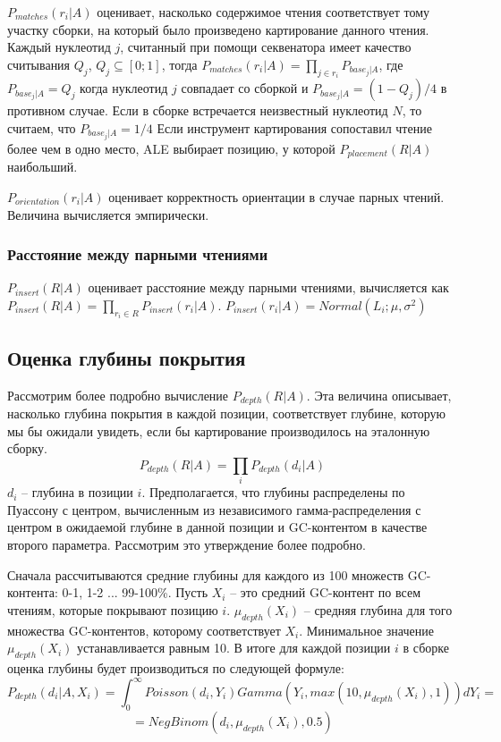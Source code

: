 $P_{matches}(r_i|A)$ оценивает, насколько содержимое чтения соответствует тому участку сборки, на который было произведено картирование данного чтения. Каждый нуклеотид $j$, считанный при помощи секвенатора имеет качество считывания $Q_j$, $Q_j\subseteq[0;1]$, тогда $P_{matches}(r_i|A) = \prod_{j \in r_i}P_{base_j|A}$, где $P_{base_j|A} = Q_j$ когда нуклеотид $j$ совпадает  со сборкой и $P_{base_j|A} = (1 - Q_j)/4$ в противном случае. Если в сборке встречается неизвестный нуклеотид $N$, то считаем, что $P_{base_j|A} = 1/4$
Если инструмент картирования сопоставил чтение более чем в одно место, ALE выбирает позицию, у которой $P_{placement}(R|A)$ наибольший.

$P_{orientation}(r_i|A)$ оценивает корректность ориентации в случае парных чтений. Величина вычисляется эмпирически.

\subsubsection{Расстояние между парными чтениями}
$P_{insert}(R|A)$ оценивает расстояние между парными чтениями, вычисляется как $P_{insert}(R|A)=\prod_{r_i \in R}P_{insert}(r_i|A)$. $P_{insert}(r_i|A) = Normal(L_i; \mu, \sigma^2)$ 

\subsection{Оценка глубины покрытия}

Рассмотрим более подробно вычисление $P_{depth}(R|A)$. Эта величина описывает, насколько глубина покрытия в каждой позиции, соответствует глубине, которую мы бы ожидали увидеть, если бы картирование производилось на эталонную сборку.
$$P_{depth}(R|A) = \prod_{i}P_{depth}(d_i|A)$$ $d_i$ – глубина в позиции $i$. Предполагается, что глубины распределены по Пуассону с центром, вычисленным из независимого гамма-распределения с центром в ожидаемой глубине в данной позиции и GC-контентом в качестве второго параметра. Рассмотрим это утверждение более подробно.

Сначала рассчитываются средние глубины для каждого из 100 множеств GC-контента: 0-1, 1-2 ... 99-100\%. Пусть $X_i$ – это средний GC-контент по всем чтениям, которые покрывают позицию $i$. $\mu_{depth}(X_i)$ – средняя глубина для того множества GC-контентов, которому соответствует $X_i$. Минимальное значение $\mu_{depth}(X_i)$ устанавливается равным 10. В итоге для каждой позиции $i$ в сборке оценка глубины будет производиться по следующей формуле:
$$P_{depth}(d_i|A, X_i)=\int_0^\infty Poisson(d_i, Y_i)Gamma(Y_i, max(10, \mu_{depth}(X_i), 1))dY_i =$$ $$=NegBinom(d_i, \mu_{depth}(X_i), 0.5)$$

